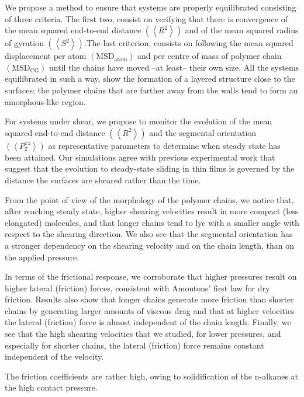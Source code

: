 \documentclass[aps,prb,reprint,superscriptaddress, a4paper]{revtex4-1}
\begin{document}
We propose a method to ensure that systems are properly equilibrated consisting of three criteria. The first two, consist on verifying that there is convergence of the mean squared end-to-end distance $\left(\left< R^2 \right> \right)$ and of  the mean squared radius of gyration $\left(\left< S^2 \right> \right)$.The last criterion, consists on following the mean squared displacement per atom $\left(\text{MSD}_{\text{atom}}\right)$ and per centre of mass of polymer chain $\left(\text{MSD}_{\text{CG}}\right)$ until the chains have moved --at least-- their own size\cite{Auhl2003}. All the systems equilibrated in such a way, show the formation of a  layered structure close to the surfaces; the polymer chains that are farther away  from the walls tend to form an amorphous-like region. 

For systems under shear, we propose to monitor the evolution of the mean squared end-to-end distance $\left(\left< R^2 \right> \right)$ and the segmental orientation $\left(\left<P_{2}^{xz} \right> \right)$ as representative parameters to determine when steady state has been attained. Our simulations  agree with previous experimental work that suggest\cite{Drummond2000} that the  evolution to steady-state sliding in thin films is governed by the distance the surfaces are sheared rather than the time.

From the point of view of the morphology of the polymer chains, we notice that, after reaching steady state, higher shearing velocities result in more compact (less elongated) molecules, and that longer chains tend to  lye  with a smaller angle with respect to the shearing direction.  We also see that the segmental orientation has a stronger dependency on the shearing velocity and on the chain length, than on the applied pressure.

In terms of the frictional response, we corroborate that higher pressures result on higher lateral (friction) forces, consistent with Amontons' first law for dry friction. Results also show that longer chains generate more friction than shorter chains by  generating larger amounts of viscous drag and that at higher velocities the  lateral (friction) force is almost independent of the chain length. Finally, we see that the high shearing velocities that we studied, for lower pressures, and especially for shorter chains, the lateral (friction) force remains constant independent of the velocity.

The friction coefficients are rather high, owing to solidification of the n-alkanes at the high contact pressure.
\end{document}
